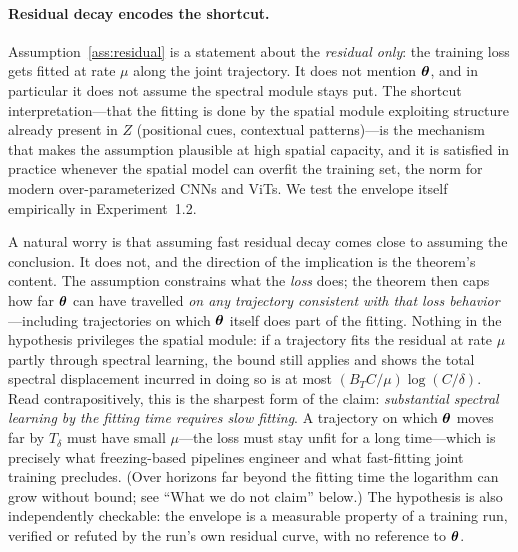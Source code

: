 \paragraph{Residual decay encodes the shortcut.}
Assumption~\ref{ass:residual} is a statement about the
\emph{residual only}: the training loss gets fitted at rate $\mu$
along the joint trajectory. It does not mention ${\boldsymbol{\theta}}$, and in
particular it does not assume the spectral module stays put. The
shortcut interpretation---that the fitting is done by the spatial
module exploiting structure already present in $Z$ (positional cues,
contextual patterns)---is the mechanism that makes the assumption
plausible at high spatial capacity, and it is satisfied in practice
whenever the spatial model can overfit the training set, the norm
for modern over-parameterized CNNs and ViTs. We test the envelope
itself empirically in Experiment~1.2.

\begin{remark}
\label{rem:not_circular}
A natural worry is that assuming fast residual decay comes close to
assuming the conclusion. It does not, and the direction of the
implication is the theorem's content. The assumption constrains what
the \emph{loss} does; the theorem then caps how far ${\boldsymbol{\theta}}$ can
have travelled \emph{on any trajectory consistent with that loss
behavior}---including trajectories on which ${\boldsymbol{\theta}}$ itself does
part of the fitting. Nothing in the hypothesis privileges the
spatial module: if a trajectory fits the residual at rate $\mu$
partly through spectral learning, the bound still applies and shows
the total spectral displacement incurred in doing so is at most
$(B_T C/\mu)\log(C/\delta)$. Read contrapositively, this is the
sharpest form of the claim: \emph{substantial spectral learning by
the fitting time requires slow fitting}. A trajectory on which
${\boldsymbol{\theta}}$ moves far by $T_\delta$
must have small $\mu$---the loss must stay unfit for a long
time---which is precisely what freezing-based pipelines engineer and
what fast-fitting joint training precludes. (Over horizons far
beyond the fitting time the logarithm can grow without bound; see
``What we do not claim'' below.) The hypothesis is also
independently checkable: the envelope is a measurable property of a
training run, verified or refuted by the run's own residual curve,
with no reference to ${\boldsymbol{\theta}}$.
\end{remark}


